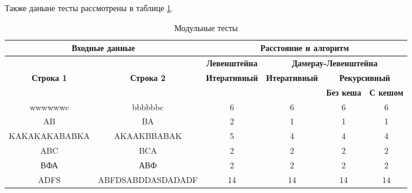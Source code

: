Также даныне тесты рассмотрены в таблице \ref{t:unit_tests}.

\begin{table}[ht]
	\small
	\begin{center}
		\begin{threeparttable}
		\caption{Модульные тесты}
        \label{t:unit_tests}
        \fontsize{6pt}{6pt}
		\begin{tabular}{|c|c|c|c|c|c|}
			\multicolumn{2}{|c|}{\bfseries Входные данные}
			& \multicolumn{4}{c|}{\bfseries Расстояние и алгоритм} \\ 
			\hline 
			&
			& \multicolumn{1}{c|}{\bfseries Левенштейна} 
			& \multicolumn{3}{c|}{\bfseries Дамерау-Левенштейна} \\ \cline{3-6}
			
			\bfseries Строка 1 & \bfseries Строка 2 & \bfseries Итеративный & \bfseries Итеративный
			
			& \multicolumn{2}{c|}{\bfseries Рекурсивный} \\ \cline{5-6}
			& & & & \bfseries Без кеша & \bfseries С кешом \\
			\hline
			wwwwwwc & bbbbbbc & 6 & 6 & 6 & 6 \\
			\hline
			AB & BA & 2 & 1 & 1 & 1 \\
			\hline
			KAKAKAKABABKA & AKAAKBBABAK & 5 & 4 & 4 & 4 \\
			\hline
			ABC & BCA & 2 & 2 & 2 & 2 \\
			\hline
			ВФА & АВФ & 2 & 2 & 2 & 2 \\
			\hline
			ADFS & ABFDSABDDASDADADF & 14 & 14 & 14 & 14 \\
			\hline
		\end{tabular}	
		\end{threeparttable}
	\end{center}
\end{table}